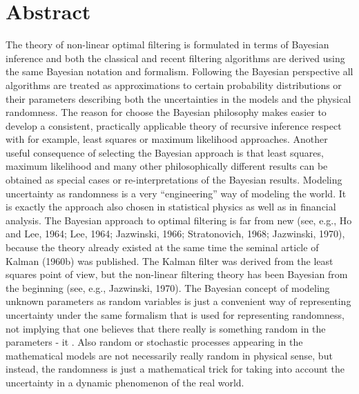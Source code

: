 \documentclass[10pt]{llncs}
\begin{document}
\section{Abstract}
The theory of non-linear optimal filtering is formulated in terms of Bayesian inference and both the classical and recent filtering algorithms are derived using the same Bayesian notation and formalism.
Following the Bayesian perspective all algorithms are treated as approximations to certain probability distributions or their parameters describing both the uncertainties in the models and the physical randomness. 
The reason for choose the Bayesian philosophy makes easier to develop a consistent, practically applicable theory of recursive inference respect with for example, least squares or maximum likelihood approaches. 
Another useful consequence of selecting the Bayesian approach is that least squares, maximum likelihood and many other philosophically different results can be obtained as special cases or re-interpretations of the Bayesian results. 
Modeling uncertainty as randomness is a very “engineering” way of modeling
the world. It is exactly the approach also chosen in statistical physics as well as
in financial analysis. The Bayesian approach to optimal filtering is far from
new (see, e.g., Ho and Lee, 1964; Lee, 1964; Jazwinski, 1966; Stratonovich, 1968;
Jazwinski, 1970), because the theory already existed at the same time the seminal
article of Kalman (1960b) was published. The Kalman filter was derived from the
least squares point of view, but the non-linear filtering theory has been Bayesian
from the beginning (see, e.g., Jazwinski, 1970).
The Bayesian concept of modeling unknown parameters as random variables is just a convenient way of representing uncertainty under the same formalism that is used for representing randomness, not implying that one believes that there really
is something random in the parameters - it .
Also random or stochastic processes appearing in the mathematical models are
not necessarily really random in physical sense, but instead, the randomness is
just a mathematical trick for taking into account the uncertainty in a dynamic
phenomenon of the real world.


\newpage
\end{document}
